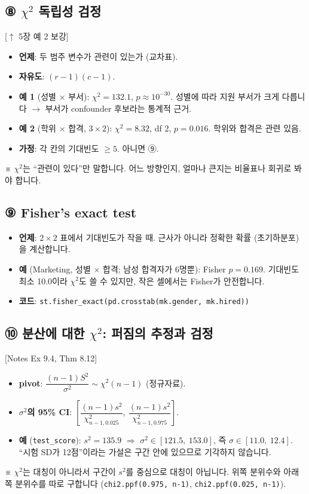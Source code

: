 \documentclass[11pt,a4paper]{article}
\newcommand{\code}[1]{\texttt{#1}}
\newcommand{\nref}[1]{{\footnotesize\textsf{\color{blue!55!black}[Notes #1]}}}
\newcommand{\aside}[1]{{\footnotesize\color{black!65}#1}}
\newcommand{\linkup}[1]{{\footnotesize\textsf{\color{green!40!black}[$\uparrow$ #1 보강]}}}
\begin{document}
\subsection*{⑧ $\chi^2$ 독립성 검정} \linkup{5장 예 2}
\begin{itemize}
\item \textbf{언제}: 두 범주 변수가 관련이 있는가 (교차표).
\item \textbf{자유도}: $(r-1)(c-1)$.
\item \textbf{예 1} (성별 $\times$ 부서): $\chi^2=132.1$, $p\approx10^{-30}$. 성별에 따라 지원 부서가 크게 다릅니다 $\to$ 부서가 confounder 후보라는 통계적 근거.
\item \textbf{예 2} (학위 $\times$ 합격, $3\times2$): $\chi^2=8.32$, df 2, $p=0.016$. 학위와 합격은 관련 있음.
\item \textbf{가정}: 각 칸의 기대빈도 $\ge5$. 아니면 ⑨.
\end{itemize}
\aside{※ $\chi^2$는 ``관련이 있다''만 말합니다. 어느 방향인지, 얼마나 큰지는 비율표나 회귀로 봐야 합니다.}

\subsection*{⑨ Fisher's exact test}
\begin{itemize}
\item \textbf{언제}: $2\times2$ 표에서 기대빈도가 작을 때. 근사가 아니라 정확한 확률 (초기하분포)을 계산합니다.
\item \textbf{예} (Marketing, 성별 $\times$ 합격; 남성 합격자가 6명뿐): Fisher $p=0.169$. 기대빈도 최소 10.0이라 $\chi^2$도 쓸 수 있지만, 작은 셀에서는 Fisher가 안전합니다.
\item \textbf{코드}: \code{st.fisher\_exact(pd.crosstab(mk.gender, mk.hired))}
\end{itemize}

\subsection*{⑩ 분산에 대한 $\chi^2$: 퍼짐의 추정과 검정} \nref{Ex 9.4, Thm 8.12}
\begin{itemize}
\item \textbf{pivot}: $\dfrac{(n-1)S^2}{\sigma^2}\sim\chi^2(n-1)$ (정규자료).
\item \textbf{$\sigma^2$의 95\% CI}: $\left[\dfrac{(n-1)s^2}{\chi^2_{n-1,0.025}},\ \dfrac{(n-1)s^2}{\chi^2_{n-1,0.975}}\right]$.
\item \textbf{예} (\code{test\_score}): $s^2=135.9$ $\Rightarrow$ $\sigma^2\in[121.5,\ 153.0]$, 즉 $\sigma\in[11.0,\ 12.4]$. ``시험 SD가 12점''이라는 가설은 구간 안에 있으므로 기각하지 않습니다.
\end{itemize}
\aside{※ $\chi^2$는 대칭이 아니라서 구간이 $s^2$를 중심으로 대칭이 아닙니다. 위쪽 분위수와 아래쪽 분위수를 따로 구합니다 (\code{chi2.ppf(0.975, n-1)}, \code{chi2.ppf(0.025, n-1)}).}
\end{document}
